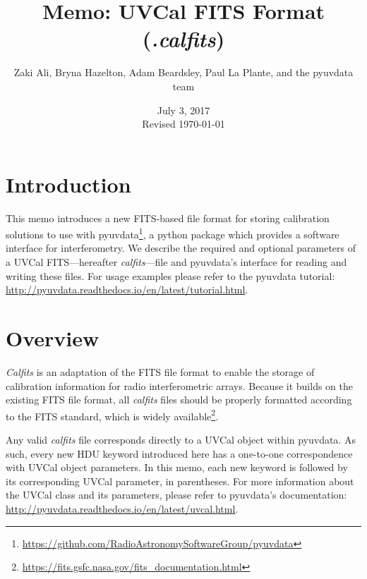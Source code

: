 \documentclass[11pt, oneside, english]{article}   	%
\title{Memo: UVCal FITS Format (\emph{.calfits})}
\author{Zaki Ali, Bryna Hazelton, Adam Beardsley, Paul La Plante, and the pyuvdata team}
\date{July 3, 2017\\
 Revised \today}
\begin{document}
\maketitle
\section{Introduction}
This memo introduces a new FITS-based file format for storing calibration solutions to use with pyuvdata\footnote{\url{https://github.com/RadioAstronomySoftwareGroup/pyuvdata}}, a python package which
provides a software interface for interferometry.
We describe the required and optional parameters of a UVCal FITS---hereafter \textit{calfits}---file and pyuvdata's interface for reading and writing these files. 
For usage examples please refer to the pyuvdata tutorial: \url{http://pyuvdata.readthedocs.io/en/latest/tutorial.html}.

\section{Overview}
\textit{Calfits} is an adaptation of the FITS file format to enable the storage of calibration information for radio interferometric arrays. %
Because it builds on the existing FITS file format, all \emph{calfits} files should be properly formatted according to the FITS standard, which is widely available\footnote{\url{https://fits.gsfc.nasa.gov/fits_documentation.html}}.


Any valid \textit{calfits} file corresponds directly to a UVCal object within pyuvdata.
As such, every new HDU keyword introduced here has a one-to-one correspondence with UVCal object parameters.
In this memo, each new keyword is followed by its corresponding UVCal parameter, in parentheses. 
For more information about the UVCal class and its parameters, please refer to pyuvdata's documentation: \url{http://pyuvdata.readthedocs.io/en/latest/uvcal.html}.
\end{document}
